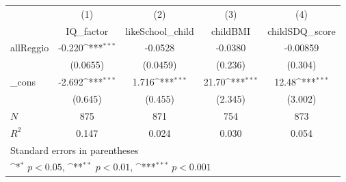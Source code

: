 {
\def\sym#1{\ifmmode^{#1}\else\(^{#1}\)\fi}
\begin{tabular}{l*{4}{c}}
\toprule
            &\multicolumn{1}{c}{(1)}&\multicolumn{1}{c}{(2)}&\multicolumn{1}{c}{(3)}&\multicolumn{1}{c}{(4)}\\
            &\multicolumn{1}{c}{IQ\_factor}&\multicolumn{1}{c}{likeSchool\_child}&\multicolumn{1}{c}{childBMI}&\multicolumn{1}{c}{childSDQ\_score}\\
\midrule
allReggio   &      -0.220\sym{***}&     -0.0528         &     -0.0380         &    -0.00859         \\
            &    (0.0655)         &    (0.0459)         &     (0.236)         &     (0.304)         \\
\addlinespace
\_cons      &      -2.692\sym{***}&       1.716\sym{***}&       21.70\sym{***}&       12.48\sym{***}\\
            &     (0.645)         &     (0.455)         &     (2.345)         &     (3.002)         \\
\midrule
\(N\)       &         875         &         871         &         754         &         873         \\
\(R^{2}\)   &       0.147         &       0.024         &       0.030         &       0.054         \\
\bottomrule
\multicolumn{5}{l}{\footnotesize Standard errors in parentheses}\\
\multicolumn{5}{l}{\footnotesize \sym{*} \(p<0.05\), \sym{**} \(p<0.01\), \sym{***} \(p<0.001\)}\\
\end{tabular}
}
